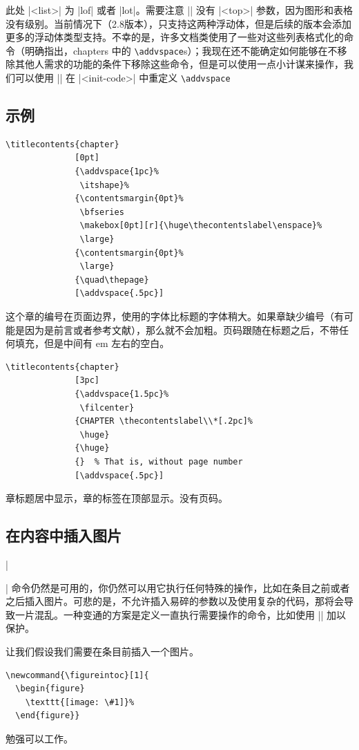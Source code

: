 \documentclass[a4paper,nofonts]{ltxguide}
\begin{document}
此处 |<list>| 为 |lof| 或者 |lot|。需要注意 |\printlist| 没有 |<top>| 参数，因为图形和表格没有级别。当前情况下（2.8版本），只支持这两种浮动体，但是后续的版本会添加更多的浮动体类型支持。不幸的是，许多文档类使用了一些对这些列表格式化的命令（明确指出，chapters 中的 \verb|\addvspace|s）；我现在还不能确定如何能够在不移除其他人需求的功能的条件下移除这些命令，但是可以使用一点小计谋来操作，我们可以使用 |\renewcommand\addvspace[1]{}| 在 |<init-code>| 中重定义 \verb|\addvspace|

\subsection{示例}

\begin{verbatim}
\titlecontents{chapter}
              [0pt]
              {\addvspace{1pc}%
               \itshape}%
              {\contentsmargin{0pt}%
               \bfseries
               \makebox[0pt][r]{\huge\thecontentslabel\enspace}%
               \large}
              {\contentsmargin{0pt}%
               \large}
              {\quad\thepage}
              [\addvspace{.5pc}]
\end{verbatim}

这个章的编号在页面边界，使用的字体比标题的字体稍大。如果章缺少编号（有可能是因为是前言或者参考文献），那么就不会加粗。页码跟随在标题之后，不带任何填充，但是中间有 em 左右的空白。

\begin{verbatim}
\titlecontents{chapter}
              [3pc]
              {\addvspace{1.5pc}%
               \filcenter}
              {CHAPTER \thecontentslabel\\*[.2pc]%
               \huge}
              {\huge}
              {}  % That is, without page number
              [\addvspace{.5pc}]
\end{verbatim}

章标题居中显示，章的标签在顶部显示。没有页码。

\subsection{在内容中插入图片}

|\addtocontents| 命令仍然是可用的，你仍然可以用它执行任何特殊的操作，比如在条目之前或者之后插入图片。可悲的是，不允许插入易碎的参数以及使用复杂的代码，那将会导致一片混乱。一种变通的方案是定义一直执行需要操作的命令，比如使用 |\protect| 加以保护。

让我们假设我们需要在条目前插入一个图片。
\begin{verbatim}
\newcommand{\figureintoc}[1]{
  \begin{figure}
    \texttt{[image: \#1]}%
  \end{figure}}
\end{verbatim}
勉强可以工作。
\end{document}
